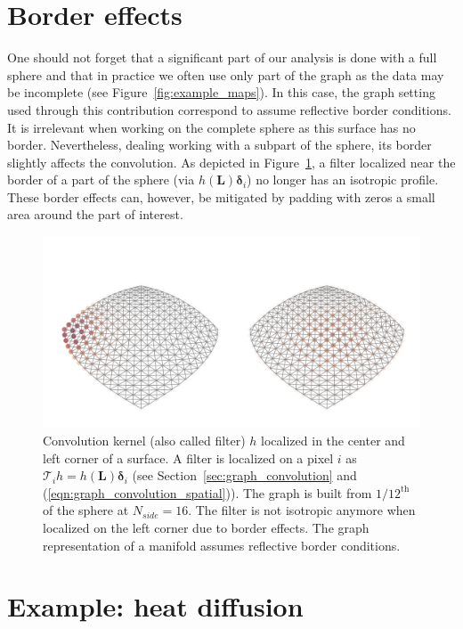 \documentclass[final,twocolumn,3p,times,authoryear]{elsarticle}
\newcommand{\figref}[1]{Figure~\ref{fig:#1}}
\newcommand{\secref}[1]{Section~\ref{sec:#1}}
\newcommand{\eqnref}[1]{(\ref{eqn:#1})}
\renewcommand{\b}[1]{{\bm{#1}}}   %
\newcommand{\1}{\b{1}}              %
\newcommand{\0}{\b{0}}              %
\renewcommand{\L}{\b{L}}
\newcommand{\T}{\mathcal{T}}
\begin{document}
\section{Border effects}
\label{sec:border_effects}

One should not forget that a significant part of our analysis is done with a full sphere and that in practice we often use only part of the graph as the data may be incomplete (see \figref{example_maps}).
In this case, the graph setting used through this contribution correspond to assume reflective border conditions.
It is irrelevant when working on the complete sphere as this surface has no border. Nevertheless, dealing working with a subpart of the sphere, its border slightly affects the convolution.
As depicted in \figref{border_effects}, a filter localized near the border of a part of the sphere (via $h(\L) \b \delta_i$) no longer has an isotropic profile.
These border effects can, however, be mitigated by padding with zeros a small area around the part of interest.

\begin{figure}
	\centering
	\includegraphics[width=\linewidth]{border_effects}
	\caption{Convolution kernel (also called filter) $h$ localized in the center and left corner of a surface. A filter is localized on a pixel $i$ as $\T_i h = h(\L) \b \delta_i$ (see \secref{graph_convolution} and \eqnref{graph_convolution_spatial}). The graph is built from $1/12^\text{th}$ of the sphere at $N_{side} = 16$. The filter is not isotropic anymore when localized on the left corner due to border effects. The graph representation of a manifold assumes reflective border conditions.}
	\label{fig:border_effects}
\end{figure}

\section{Example: heat diffusion}
\label{sec:heat_diffusion}
\label{sec:filter_visualization}
\end{document}
